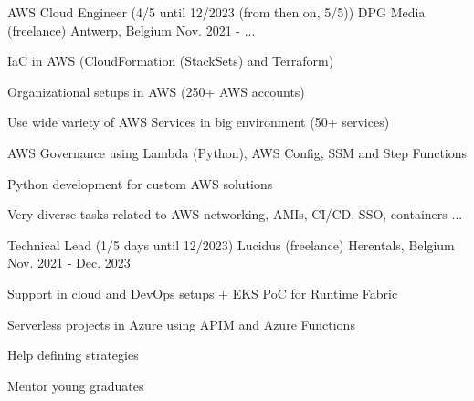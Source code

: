 

\begin{cventries}

  \cventry
    {AWS Cloud Engineer (4/5 until 12/2023 (from then on, 5/5))} %
    {DPG Media (freelance)} %
    {Antwerp, Belgium} %
    {Nov. 2021 - ...} %
    {
      \begin{cvitems} %
        \item {IaC in AWS (CloudFormation (StackSets) and Terraform)}
        \item {Organizational setups in AWS (250+ AWS accounts)}
        \item {Use wide variety of AWS Services in big environment (50+ services)}
        \item {AWS Governance using Lambda (Python), AWS Config, SSM and Step Functions}
        \item {Python development for custom AWS solutions}       
        \item {Very diverse tasks related to AWS networking, AMIs, CI/CD, SSO, containers ...}
      \end{cvitems}
    }

  \cventry
    {Technical Lead (1/5 days until 12/2023)} %
    {Lucidus (freelance)} %
    {Herentals, Belgium} %
    {Nov. 2021 - Dec. 2023} %
    {
      \begin{cvitems} %
        \item {Support in cloud and DevOps setups + EKS PoC for Runtime Fabric}
        \item {Serverless projects in Azure using APIM and Azure Functions}
        \item {Help defining strategies}
        \item {Mentor young graduates}
      \end{cvitems}
    }


\end{cventries}
